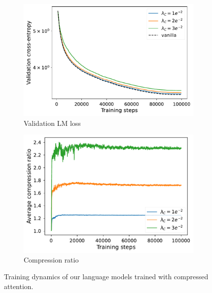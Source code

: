 \begin{figure}[!ht]
    \centering
    \begin{subfigure}[b]{0.6\columnwidth}
         \includegraphics[width=\linewidth]{sources/part_2/kv_cache/imgs/ce_val.pdf}
         \caption{Validation LM loss}
    \end{subfigure}
    \begin{subfigure}[b]{0.6\columnwidth}
         \includegraphics[width=\linewidth]{sources/part_2/kv_cache/imgs/comp_ratio.pdf}
         \caption{Compression ratio}
         \label{fig:train_dmc_cr}
    \end{subfigure}
    
    \caption{Training dynamics of our language models trained with compressed attention.}
    \label{fig:train_dmc}
\end{figure}

